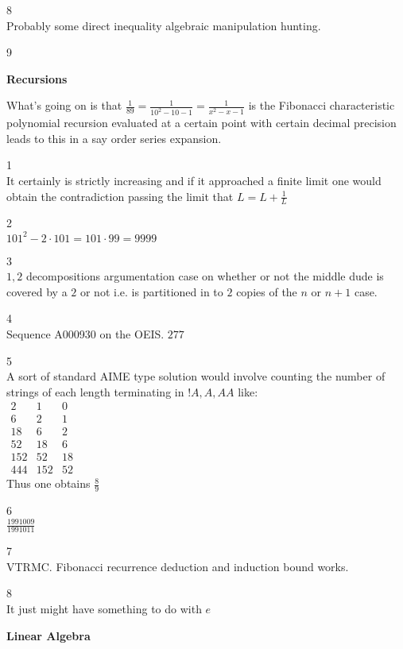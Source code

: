 8 \\
Probably some direct inequality algebraic manipulation hunting.

9 \\


\newpage

\textbf{Recursions}

What's going on is that $\frac{1}{89}=\frac{1}{10^2-10-1}=\frac{1}{x^2-x-1}$ is the Fibonacci characteristic polynomial recursion evaluated at a certain point with certain decimal precision leads to this in a say order series expansion.

1 \\
It certainly is strictly increasing and if it approached a finite limit one would obtain the contradiction passing the limit that $L=L+\frac{1}{L}$

2 \\
$101^2-2\cdot 101=101\cdot 99=\boxed{9999}$

3 \\
$1,2$ decompositions argumentation case on whether or not the middle dude is covered by a $2$ or not i.e. is partitioned in to $2$ copies of the $n$ or $n+1$ case.

4 \\
Sequence A000930 on the OEIS. $\boxed{277}$

5 \\
A sort of standard AIME type solution would involve counting the number of strings of each length terminating in $!A,A,AA$ like: \\
$
\begin{matrix}
2 & 1 & 0 \\
6 & 2 & 1 \\
18 & 6 & 2 \\
52 & 18 & 6 \\
152 & 52 & 18 \\
444 & 152 & 52
\end{matrix}
$ \\
Thus one obtains $\boxed{\frac{8}{9}}$

6 \\
$\boxed{\frac{1991009}{1991011}}$

7 \\
VTRMC. Fibonacci recurrence deduction and induction bound works.

8 \\
It just might have something to do with $e$

\newpage

\textbf{Linear Algebra}

